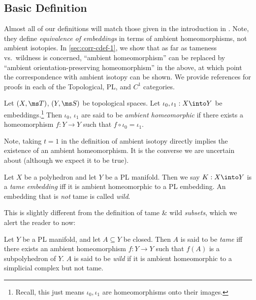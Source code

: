 \subsection{Basic Definition}
Almost all of our definitions will match those given in the
introduction in \cite{Daverman}. Note, they define \emph{equivalence
  of embeddings} in terms of ambient homeomorphisms, not ambient
isotopies. In \cref{sec:corr-cdef-1}, we show that as far as tameness
vs.\ wildness is concerned, ``ambient homeomorphism'' can be replaced
by ``ambient orientation-preserving homeomorphism'' in the above, at
which point the correspondence with ambient isotopy can be shown. We
provide references for proofs in each of the Topological, PL, and
$C^1$ categories.

\begin{definition}\label{def:ambient-homeomorphic}
  Let $(X, \ms T)$, $(Y, \ms S)$ be topological spaces. Let $\iota_0,
  \iota_1 : X \into Y$ be embeddings.\footnote{Recall, this just means
    $\iota_0, \iota_1$ are homeomorphisms onto their images.} Then
  $\iota_0$, $\iota_1$ are said to be \emph{ambient homeomorphic} if
  there exists a homeomorphism $f : Y \to Y$ such that $f \circ
  \iota_0 = \iota_1$.
\end{definition}
Note, taking $t=1$ in the definition of ambient isotopy directly
implies the existence of an ambient homeomorphism. It is the converse
we are uncertain about (although we expect it to be true).
\begin{definition}\label{def:tame-and-wild}
  Let $X$ be a polyhedron and let $Y$ be a PL manifold. Then we say $K
  : X \into Y$ is a \emph{tame embedding} iff it is ambient
  homeomorphic to a PL embedding. An embedding that is \emph{not} tame
  is called \emph{wild}.
\end{definition}
This is slightly different from the definition of tame \& wild
\emph{subsets}, which we alert the reader to now:
\begin{definition}\label{def:tame-and-wild-subsets}
  Let $Y$ be a PL manifold, and let $A \subseteq Y$ be closed. Then
  $A$ is said to be \emph{tame} iff there exists an ambient
  homeomorphism $f : Y \to Y$ such that $f(A)$ is a subpolyhedron of
  $Y$. $A$ is said to be \emph{wild} if it is ambient homeomorphic to
  a simplicial complex but not tame.
\end{definition}
